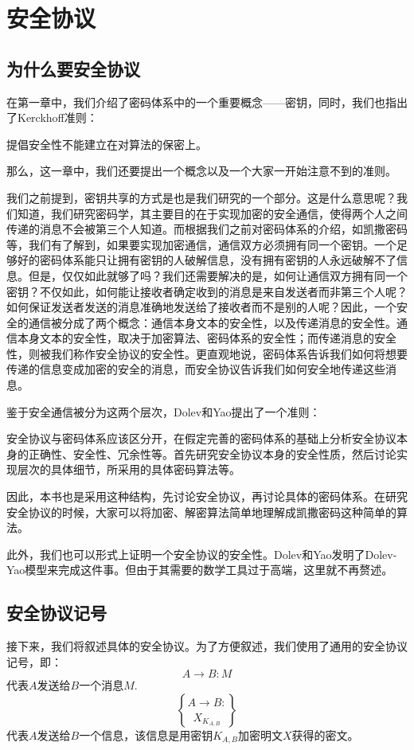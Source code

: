 \chapter{安全协议}
\section{为什么要安全协议}
在第一章中，我们介绍了密码体系中的一个重要概念——密钥，同时，我们也指出了Kerckhoff准则：\par
提倡安全性不能建立在对算法的保密上。\par
那么，这一章中，我们还要提出一个概念以及一个大家一开始注意不到的准则。\par
我们之前提到，密钥共享的方式是也是我们研究的一个部分。这是什么意思呢？我们知道，我们研究密码学，其主要目的在于实现加密的安全通信，使得两个人之间传递的消息不会被第三个人知道。而根据我们之前对密码体系的介绍，如凯撒密码等，我们有了解到，如果要实现加密通信，通信双方必须拥有同一个密钥。一个足够好的密码体系能只让拥有密钥的人破解信息，没有拥有密钥的人永远破解不了信息。但是，仅仅如此就够了吗？我们还需要解决的是，如何让通信双方拥有同一个密钥？不仅如此，如何能让接收者确定收到的消息是来自发送者而非第三个人呢？如何保证发送者发送的消息准确地发送给了接收者而不是别的人呢？因此，一个安全的通信被分成了两个概念：通信本身文本的安全性，以及传递消息的安全性。通信本身文本的安全性，取决于加密算法、密码体系的安全性；而传递消息的安全性，则被我们称作安全协议的安全性。更直观地说，密码体系告诉我们如何将想要传递的信息变成加密的安全的消息，而安全协议告诉我们如何安全地传递这些消息。\par
鉴于安全通信被分为这两个层次，Dolev和Yao提出了一个准则：\par
安全协议与密码体系应该区分开，在假定完善的密码体系的基础上分析安全协议本身的正确性、安全性、冗余性等。首先研究安全协议本身的安全性质，然后讨论实现层次的具体细节，所采用的具体密码算法等。\par
因此，本书也是采用这种结构，先讨论安全协议，再讨论具体的密码体系。在研究安全协议的时候，大家可以将加密、解密算法简单地理解成凯撒密码这种简单的算法。\par
此外，我们也可以形式上证明一个安全协议的安全性。Dolev和Yao发明了Dolev-Yao模型来完成这件事。但由于其需要的数学工具过于高端，这里就不再赘述。
\section{安全协议记号}
接下来，我们将叙述具体的安全协议。为了方便叙述，我们使用了通用的安全协议记号，即：
\[A\to B: M\]
代表$A$发送给$B$一个消息$M$.
\[A\to B: \brace{X}_{K_{A, B}}\]
代表$A$发送给$B$一个信息，该信息是用密钥$K_{A, B}$加密明文$X$获得的密文。
